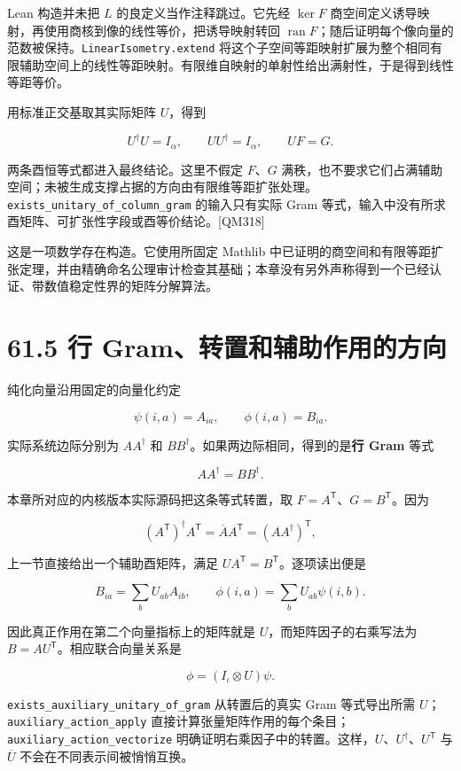 \documentclass[
  11pt,
  oneside]{book}
\begin{document}
Lean 构造并未把 \(L\) 的良定义当作注释跳过。它先经 \(\ker F\)
商空间定义诱导映射，再使用商核到像的线性等价，把诱导映射转回
\(\operatorname{ran}F\)；随后证明每个像向量的范数被保持。\texttt{Linear\allowbreak Isometry.\allowbreak extend}
将这个子空间等距映射扩展为整个相同有限辅助空间上的线性等距映射。有限维自映射的单射性给出满射性，于是得到线性等距等价。

用标准正交基取其实际矩阵 \(U\)，得到

\[
U^\dagger U=I_\alpha,\qquad UU^\dagger=I_\alpha,
\qquad UF=G.
\]

两条酉恒等式都进入最终结论。这里不假定 \(F\)、\(G\)
满秩，也不要求它们占满辅助空间；未被生成支撑占据的方向由有限维等距扩张处理。\texttt{exists\_\allowbreak unitary\_\allowbreak of\_\allowbreak column\_\allowbreak gram}
的输入只有实际 Gram
等式，输入中没有所求酉矩阵、可扩张性字段或酉等价结论。{[}QM318{]}

这是一项数学存在构造。它使用所固定 Mathlib
中已证明的商空间和有限等距扩张定理，并由精确命名公理审计检查其基础；本章没有另外声称得到一个已经认证、带数值稳定性界的矩阵分解算法。

\section{61.5 行 Gram、转置和辅助作用的方向}

纯化向量沿用固定的向量化约定

\[
\psi(i,a)=A_{ia},\qquad\phi(i,a)=B_{ia}.
\]

实际系统边际分别为 \(AA^\dagger\) 和
\(BB^\dagger\)。如果两边际相同，得到的是\textbf{行 Gram} 等式

\[
AA^\dagger=BB^\dagger.
\]

本章所对应的内核版本实际源码把这条等式转置，取
\(F=A^\mathsf T\)、\(G=B^\mathsf T\)。因为

\[
(A^\mathsf T)^\dagger A^\mathsf T
=\overline A A^\mathsf T=(AA^\dagger)^\mathsf T,
\]

上一节直接给出一个辅助酉矩阵，满足
\(UA^\mathsf T=B^\mathsf T\)。逐项读出便是

\[
B_{ia}=\sum_bU_{ab}A_{ib},
\qquad
\phi(i,a)=\sum_bU_{ab}\psi(i,b).
\]

因此真正作用在第二个向量指标上的矩阵就是 \(U\)，而矩阵因子的右乘写法为
\(B=AU^\mathsf T\)。相应联合向量关系是

\[
\phi=(I_\iota\otimes U)\psi.
\]

\texttt{exists\_\allowbreak auxiliary\_\allowbreak unitary\_\allowbreak of\_\allowbreak gram} 从转置后的真实 Gram
等式导出所需 \(U\)；\texttt{auxiliary\_\allowbreak action\_\allowbreak apply}
直接计算张量矩阵作用的每个条目；\texttt{auxiliary\_\allowbreak action\_\allowbreak vectorize}
明确证明右乘因子中的转置。这样，\(U\)、\(U^\dagger\)、\(U^\mathsf T\) 与
\(\overline U\) 不会在不同表示间被悄悄互换。
\end{document}
